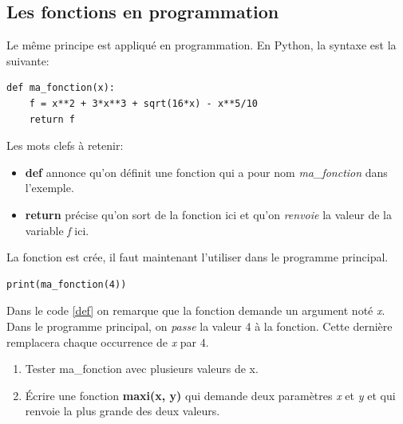\documentclass[a4paper,11pt]{article}
\begin{document}
\begin{Form}
\begin{figure}[!h]
\label{fonction}
\end{figure}
\subsection{Les fonctions en programmation}
Le même principe est appliqué en programmation. En Python, la syntaxe est la suivante:
\begin{code}[!h]
\begin{lstlisting}
def ma_fonction(x):
	f = x**2 + 3*x**3 + sqrt(16*x) - x**5/10
	return f
\end{lstlisting}
\label{def}
\end{code}

Les mots clefs à retenir:
\begin{itemize}
\item \textbf{def} annonce qu'on définit une fonction qui a pour nom \emph{ma\_fonction} dans l'exemple.
\item \textbf{return} précise qu'on sort de la fonction ici et qu'on \emph{renvoie} la valeur de la variable \emph{f} ici.
\end{itemize}
La fonction est crée, il faut maintenant l'utiliser dans le programme principal.
\begin{lstlisting}
print(ma_fonction(4))
\end{lstlisting}
Dans le code \ref{def} on remarque que la fonction demande un argument noté \emph{x}. Dans le programme principal, on \emph{passe} la valeur 4 à la fonction. Cette dernière remplacera chaque occurrence de \emph{x} par 4.
\begin{activite}
\begin{enumerate}
\item Tester ma\_fonction avec plusieurs valeurs de x.
\item Écrire une fonction \textbf{maxi(x, y)} qui demande deux paramètres \emph{x} et \emph{y} et qui renvoie la plus grande des deux valeurs.
\end{enumerate}
\end{activite}

\end{Form}
\end{document}
